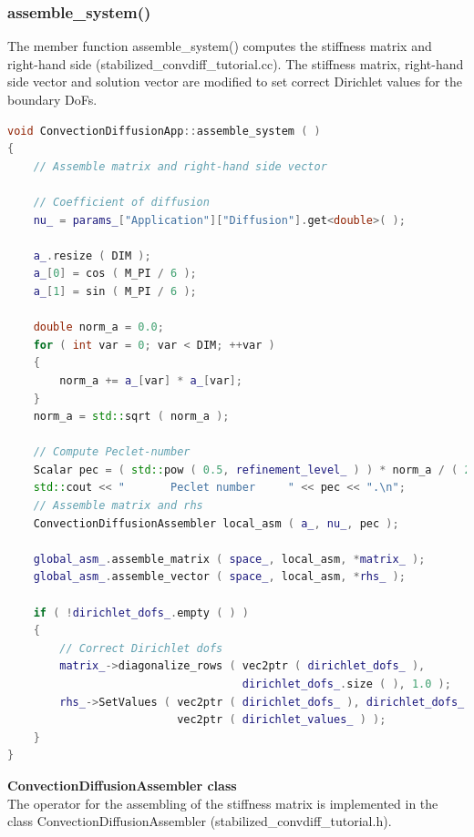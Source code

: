 \documentclass[a4paper, 11pt, twoside]{article}
\begin{document}
\subsubsection{assemble\_system()}
The member function assemble\_system() computes the stiffness matrix and right-hand side (stabilized\_convdiff\_tutorial.cc). The stiffness matrix, right-hand side vector and solution vector are modified to set correct Dirichlet values for the boundary DoFs.
\begin{lstlisting}[language=C++, basicstyle={\footnotesize, \ttfamily}, keywordstyle=\color{blue}, numbers=none, tabsize=4]
void ConvectionDiffusionApp::assemble_system ( )
{
    // Assemble matrix and right-hand side vector

    // Coefficient of diffusion
    nu_ = params_["Application"]["Diffusion"].get<double>( );

    a_.resize ( DIM );
    a_[0] = cos ( M_PI / 6 );
    a_[1] = sin ( M_PI / 6 );

    double norm_a = 0.0;
    for ( int var = 0; var < DIM; ++var )
    {
        norm_a += a_[var] * a_[var];
    }
    norm_a = std::sqrt ( norm_a );

    // Compute Peclet-number
    Scalar pec = ( std::pow ( 0.5, refinement_level_ ) ) * norm_a / ( 2 * nu_ );
    std::cout << "       Peclet number     " << pec << ".\n";
    // Assemble matrix and rhs
    ConvectionDiffusionAssembler local_asm ( a_, nu_, pec );

    global_asm_.assemble_matrix ( space_, local_asm, *matrix_ );
    global_asm_.assemble_vector ( space_, local_asm, *rhs_ );

    if ( !dirichlet_dofs_.empty ( ) )
    {
        // Correct Dirichlet dofs
        matrix_->diagonalize_rows ( vec2ptr ( dirichlet_dofs_ ),
                                    dirichlet_dofs_.size ( ), 1.0 );
        rhs_->SetValues ( vec2ptr ( dirichlet_dofs_ ), dirichlet_dofs_.size ( ),
                          vec2ptr ( dirichlet_values_ ) );
    }
}
\end{lstlisting}

\textbf{ConvectionDiffusionAssembler class}\\
The operator for the assembling of the stiffness matrix is implemented in the class ConvectionDiffusionAssembler (stabilized\_convdiff\_tutorial.h).
\end{document}
